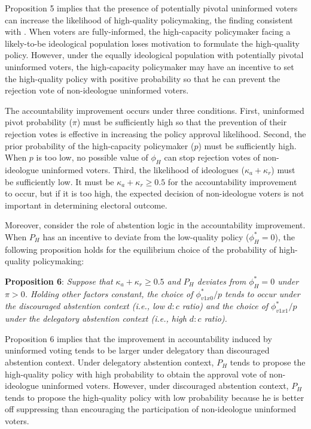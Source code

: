\documentclass[letterpaper, 12pt]{article}
\begin{document}
    \par Proposition 5 implies that the presence of potentially pivotal uninformed voters can increase the likelihood of high-quality policymaking, the finding consistent with \cite{Ashworth2014isvo}. When voters are fully-informed, the high-capacity policymaker facing a likely-to-be ideological population loses motivation to formulate the high-quality policy. However, under the equally ideological population with potentially pivotal uninformed voters, the high-capacity policymaker may have an incentive to set the high-quality policy with positive probability so that he can prevent the rejection vote of non-ideologue uninformed voters.
    
    \par The accountability improvement occurs under three conditions. First, uninformed pivot probability ($\pi$) must be sufficiently high so that the prevention of their rejection votes is effective in increasing the policy approval likelihood. Second, the prior probability of the high-capacity policymaker ($p$) must be sufficiently high. When $p$ is too low, no possible value of $\phi_H$ can stop rejection votes of non-ideologue uninformed voters. Third, the likelihood of ideologues ($\kappa_{a}+\kappa_{r}$) must be sufficiently low. It must be $\kappa_{a}+\kappa_{r} \geq 0.5$ for the accountability improvement to occur, but if it is too high, the expected decision of non-ideologue voters is not important in determining electoral outcome.
    
    \par Moreover, consider the role of abstention logic in the accountability improvement. When $P_H$ has an incentive to deviate from the low-quality policy ($\phi^*_H=0$), the following proposition holds for the equilibrium choice of the probability of high-quality policymaking:
    
    \noindent \textbf{Proposition 6}: \textit{Suppose that $\kappa_{a}+\kappa_{r} \geq 0.5$ and $P_H$ deviates from $\phi^*_H=0$ under $\pi>0$. Holding other factors constant, the choice of $\phi^*_{v1x0}/p$ tends to occur under the discouraged abstention context (i.e., low $d:c$ ratio) and the choice of $\phi^*_{v1x1}/p$ under the delegatory abstention context (i.e., high $d:c$ ratio).}
    
    \noindent Proposition 6 implies that the improvement in accountability induced by uninformed voting tends to be larger under delegatory than discouraged abstention context. Under delegatory abstention context, $P_H$ tends to propose the high-quality policy with high probability to obtain the approval vote of non-ideologue uninformed voters. However, under discouraged abstention context, $P_H$ tends to propose the high-quality policy with low probability because he is better off suppressing than encouraging the participation of non-ideologue uninformed voters.
    
\end{document}
